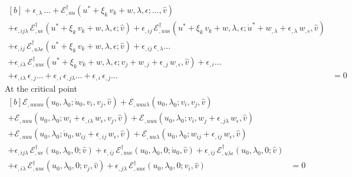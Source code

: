 \documentclass[12pt, final]{scrartcl}
\theoremstyle{definition}
\newcommand{\E}{\mathcal E}
\newcommand{\EE}{\mathcal E ^ \dagger}
\begin{document}
\begin{equation}
\begin{aligned}[b]
    + \epsilon_{,\lambda} \, \ldots + \EE_{,uu}(u^\ast + \xi_k \, v_k + w, \lambda, \epsilon; \ldots, \hat{v}) &\\
    + \epsilon_{,ij\lambda} \, \EE_{,u\epsilon}(u^\ast + \xi_k \, v_k + w, \lambda, \epsilon; \hat{v}) + \epsilon_{,ij} \, \EE_{,uu\epsilon}(u^\ast + \xi_k \, v_k + w, \lambda, \epsilon; \dot{u}^\ast + w_{,\lambda} + \epsilon_{,\lambda} \, w_{,\epsilon}, \hat{v}) &\\
    + \epsilon_{,ij} \, \EE_{,u\lambda\epsilon}(u^\ast + \xi_k \, v_k + w, \lambda, \epsilon; \hat{v}) + \epsilon_{,ij} \, \epsilon_{,\lambda} \ldots &\\
    + \epsilon_{,i\lambda} \, \EE_{,uu\epsilon}(u^\ast + \xi_k \, v_k + w, \lambda, \epsilon; v_j + w_{,j} + \epsilon_{,j} \, w_{,\epsilon}, \hat{v}) + \epsilon_{,i} \ldots &\\
    + \epsilon_{,i\lambda} \, \epsilon_{,j} \ldots + \epsilon_{,i} \, \epsilon_{,j\lambda} \ldots + \epsilon_{,i} \, \epsilon_{,j} \ldots &= 0
  \end{aligned}
\end{equation}
At the critical point
\begin{equation}
  \begin{aligned}[b]
    \E_{,uuuu}(u_0, \lambda_0; \dot{u}_0, v_i, v_j, \hat{v}) + \E_{,uuu\lambda}(u_0, \lambda_0; v_i, v_j, \hat{v}) &\\
    + \E_{,uuu}(u_0, \lambda_0; w_i + \epsilon_{,i\lambda} \,  w_\epsilon, v_j, \hat{v}) + \E_{,uuu}(u_0, \lambda_0; v_i, w_j + \epsilon_{,j\lambda} \,  w_\epsilon, \hat{v}) &\\
    + \E_{,uuu}(u_0, \lambda_0; \dot{u}_0, w_{ij} + \epsilon_{,ij} \, w_\epsilon , \hat{v}) + \E_{,uu\lambda}(u_0, \lambda_0; w_{ij} + \epsilon_{,ij} \, w_\epsilon, \hat{v}) &\\
    + \epsilon_{,ij\lambda} \, \EE_{,u\epsilon}(u_0, \lambda_0, 0; \hat{v}) + \epsilon_{,ij} \, \EE_{,uu\epsilon}(u_0, \lambda_0, 0; \dot{u}_0, \hat{v}) + \epsilon_{,ij} \, \EE_{,u\lambda\epsilon}(u_0, \lambda_0, 0; \hat{v}) &\\
    + \epsilon_{,i\lambda} \, \EE_{,uu\epsilon}(u_0, \lambda_0, 0; v_j, \hat{v}) + \epsilon_{,j\lambda} \, \EE_{,uu\epsilon}(u_0, \lambda_0, 0; v_i, \hat{v}) &= 0
  \end{aligned}
\end{equation}
\end{document}
